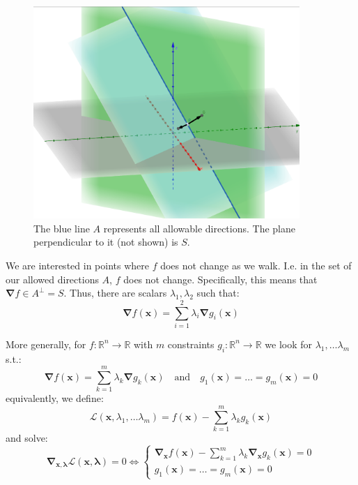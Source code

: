 \documentclass{article}
\begin{document}
\begin{theorem}
\begin{figure}[H] \centering \includegraphics[height=0.3\textheight,width=0.9\textwidth,keepaspectratio]{lagrangeMultipleAllowable2} \caption{The blue line $A$ represents all allowable directions. The plane perpendicular to it (not shown) is $S$. } \label{fig:lagrangeMultipleAllowable2} \end{figure}
We are interested in points where $f$ does not change as we walk. I.e. in the set of our allowed directions $A$, $f$ does not change.
Specifically, this means that $\bm{\nabla}f \in A^{\perp} = S$. Thus, there are scalars $\lambda_1, \lambda_2$ such that:
\[
  \bm{\nabla}f(\bm{x}) = \sum_{i=1}^{2} \lambda_i \bm{\nabla}g_i(\bm{x})
\]

More generally, for $f: \mathbb{R}^{n} \to \mathbb{R}$ with $m$ constraints $g_i: \mathbb{R}^{n} \to \mathbb{R}$ we look for $\lambda_1, \ldots  \lambda_m$ s.t.:
\[
  \bm{\nabla}f(\bm{x}) = \sum_{k=1}^{m} \lambda_k \bm{\nabla}g_{k} (\bm{x}) \quad \text{and} \quad g_1(\bm{x}) = \ldots  = g_{m}(\bm{x}) = 0 
\]
equivalently, we define:
\[
  \mathcal{L}(\bm{x}, \lambda_1, \ldots \lambda_m) = f(\bm{x}) - \sum_{k=1}^{m} \lambda_k g_k(\bm{x})
\]
and solve:
\[
  \bm{\nabla}_{\bm{x}, \bm{\lambda}} \mathcal{L}(\bm{x}, \bm{\lambda}) = 0 \iff \begin{cases} \bm{\nabla}_{\bm{x}} f(\bm{x}) - \displaystyle\sum_{k=1}^{m} \lambda_k \bm{\nabla}_{\bm{x}} g_k(\bm{x}) = 0 \\ g_1(\bm{x}) = \ldots  = g_{m}(\bm{x}) = 0  \end{cases} 
\]
\end{theorem}
\end{document}
